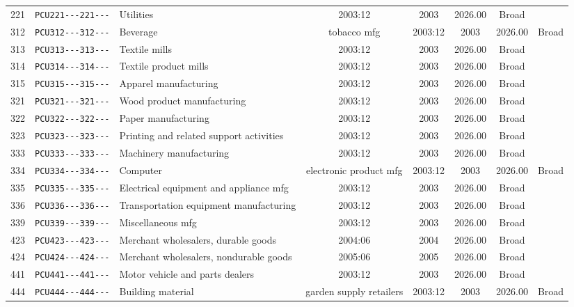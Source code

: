 \begin{longtable}{llp{4.5cm}cccc}
  221 & \texttt{PCU221{-}{-}{-}221{-}{-}{-}} & Utilities & 2003:12 & 2003 & 2026.00 & Broad \\ 
  312 & \texttt{PCU312{-}{-}{-}312{-}{-}{-}} & Beverage & tobacco mfg & 2003:12 & 2003 & 2026.00 & Broad \\ 
  313 & \texttt{PCU313{-}{-}{-}313{-}{-}{-}} & Textile mills & 2003:12 & 2003 & 2026.00 & Broad \\ 
  314 & \texttt{PCU314{-}{-}{-}314{-}{-}{-}} & Textile product mills & 2003:12 & 2003 & 2026.00 & Broad \\ 
  315 & \texttt{PCU315{-}{-}{-}315{-}{-}{-}} & Apparel manufacturing & 2003:12 & 2003 & 2026.00 & Broad \\ 
  321 & \texttt{PCU321{-}{-}{-}321{-}{-}{-}} & Wood product manufacturing & 2003:12 & 2003 & 2026.00 & Broad \\ 
  322 & \texttt{PCU322{-}{-}{-}322{-}{-}{-}} & Paper manufacturing & 2003:12 & 2003 & 2026.00 & Broad \\ 
  323 & \texttt{PCU323{-}{-}{-}323{-}{-}{-}} & Printing and related support activities & 2003:12 & 2003 & 2026.00 & Broad \\ 
  333 & \texttt{PCU333{-}{-}{-}333{-}{-}{-}} & Machinery manufacturing & 2003:12 & 2003 & 2026.00 & Broad \\ 
  334 & \texttt{PCU334{-}{-}{-}334{-}{-}{-}} & Computer & electronic product mfg & 2003:12 & 2003 & 2026.00 & Broad \\ 
  335 & \texttt{PCU335{-}{-}{-}335{-}{-}{-}} & Electrical equipment  and appliance mfg & 2003:12 & 2003 & 2026.00 & Broad \\ 
  336 & \texttt{PCU336{-}{-}{-}336{-}{-}{-}} & Transportation equipment manufacturing & 2003:12 & 2003 & 2026.00 & Broad \\ 
  339 & \texttt{PCU339{-}{-}{-}339{-}{-}{-}} & Miscellaneous mfg & 2003:12 & 2003 & 2026.00 & Broad \\ 
  423 & \texttt{PCU423{-}{-}{-}423{-}{-}{-}} & Merchant wholesalers, durable goods & 2004:06 & 2004 & 2026.00 & Broad \\ 
  424 & \texttt{PCU424{-}{-}{-}424{-}{-}{-}} & Merchant wholesalers, nondurable goods & 2005:06 & 2005 & 2026.00 & Broad \\ 
  441 & \texttt{PCU441{-}{-}{-}441{-}{-}{-}} & Motor vehicle and parts dealers & 2003:12 & 2003 & 2026.00 & Broad \\ 
  444 & \texttt{PCU444{-}{-}{-}444{-}{-}{-}} & Building material & garden supply retailers & 2003:12 & 2003 & 2026.00 & Broad \\ 

\end{longtable}
